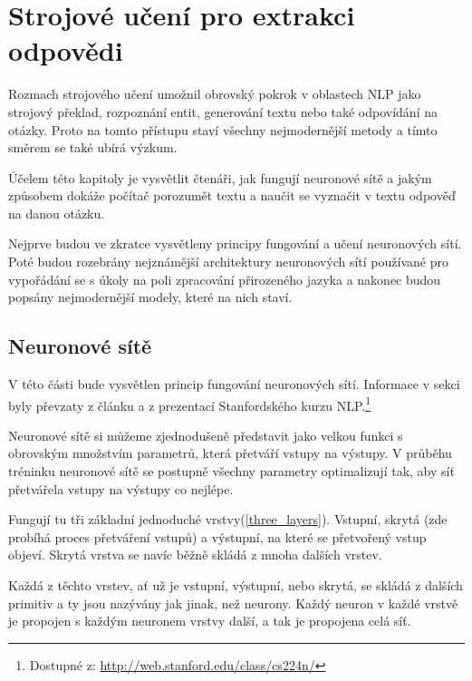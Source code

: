 
\chapter{Strojové učení pro extrakci odpovědi}
\label{language_comprehension}

Rozmach strojového učení umožnil obrovský pokrok v oblastech NLP jako strojový překlad, rozpoznání entit, generování textu nebo také odpovídání na otázky. Proto na tomto přístupu staví všechny nejmodernější metody a tímto směrem se také ubírá výzkum.\par
Účelem této kapitoly je vysvětlit čtenáři, jak fungují neuronové sítě a jakým způsobem dokáže počítač porozumět textu a naučit se vyznačit v textu odpověď na danou otázku.\par
Nejprve budou ve zkratce vysvětleny principy fungování a učení neuronových sítí. Poté budou rozebrány nejznámější architektury neuronových sítí používané pro vypořádání se s úkoly na poli zpracování přirozeného jazyka a nakonec budou popsány nejmodernější modely, které na nich staví.
\bigskip

\section{Neuronové sítě}
\label{neuronove_site}
V této části bude vysvětlen princip fungování neuronových sítí. Informace v sekci byly převzaty z článku \cite{neural_nets} a z prezentací Stanfordského kurzu NLP.\footnote{Dostupné z: \url{http://web.stanford.edu/class/cs224n/}}\par
Neuronové sítě si můžeme zjednodušeně představit jako velkou funkci s obrovským množstvím parametrů, která přetváří vstupy na výstupy. V průběhu tréninku neuronové sítě se postupně všechny parametry optimalizují tak, aby síť přetvářela vstupy na výstupy co nejlépe.\par
Fungují tu tři základní jednoduché vrstvy(\ref{three_layers}). Vstupní, skrytá (zde probíhá proces přetváření vstupů) a výstupní, na které se přetvořený vstup objeví. Skrytá vrstva se navíc běžně skládá z mnoha dalších vrstev.\par
Každá z těchto vrstev, ať už je vstupní, výstupní, nebo skrytá, se skládá z dalších primitiv a ty jsou nazývány jak jinak, než neurony. Každý neuron v každé vrstvě je propojen s každým neuronem vrstvy další, a tak je propojena celá síť.

